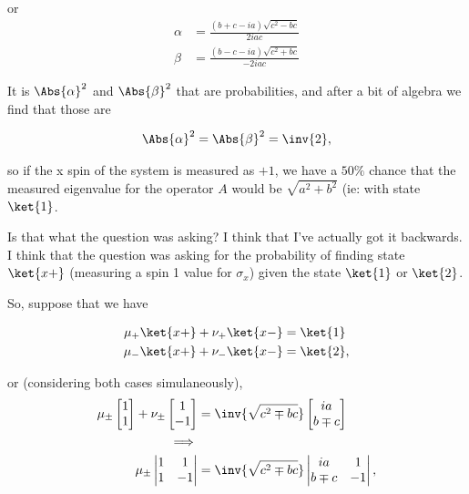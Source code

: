 or
\begin{align}\label{eqn:desaiCh5:209}
\alpha &= \frac{(b + c - ia)\sqrt{c^2 - b c}}{2 i a c} \\ %
\beta &= \frac{(b - c - ia)\sqrt{c^2 + b c}}{-2 i a c} %
\end{align}

It is $\Abs{\alpha}^2$ and $\Abs{\beta}^2$ that are probabilities, and after a bit of algebra we find that those are

\begin{align}\label{eqn:desaiCh5:210}
\Abs{\alpha}^2 = \Abs{\beta}^2 = \inv{2},
\end{align}

so if the x spin of the system is measured as $+1$, we have a $50\%$ chance that the measured eigenvalue for the operator $A$ would be $\sqrt{a^2 + b^2}$ (ie: with state $\ket{1}$.

Is that what the question was asking?  I think that I've actually got it backwards.  I think that the question was asking for the probability of finding state $\ket{x+}$ (measuring a spin 1 value for $\sigma_x$) given the state $\ket{1}$ or $\ket{2}$.

So, suppose that we have

\begin{align}\label{eqn:desaiCh5:211}
\mu_{+} \ket{x+} + \nu_{+} \ket{x-} &= \ket{1} \\
\mu_{-} \ket{x+} + \nu_{-} \ket{x-} &= \ket{2},
\end{align}

or (considering both cases simulaneously), 
\begin{align*}
\mu_{\pm}
\begin{bmatrix}
1 \\
1
\end{bmatrix}
+ \nu_{\pm}
\begin{bmatrix}
1 \\
-1
\end{bmatrix}
&= 
\inv{\sqrt{ c^2 \mp b c }} 
\begin{bmatrix}
i a \\
b \mp c
\end{bmatrix} \\
\implies \\
\mu_{\pm}
\begin{vmatrix}
1 & 1 \\
1 & -1
\end{vmatrix}
&= 
\inv{\sqrt{ c^2 \mp b c }} 
\begin{vmatrix}
i a & 1 \\
b \mp c & -1
\end{vmatrix},
\end{align*}


